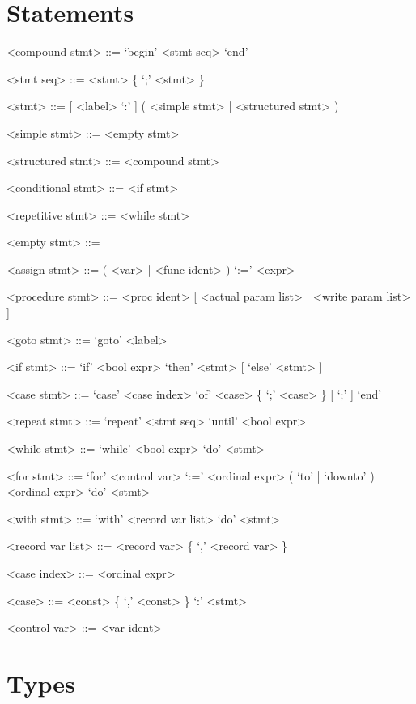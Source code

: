 \documentclass{article}
\begin{document}
\section{Statements}

{
  \begin{grammar}
    <compound stmt> ::= `begin' <stmt seq> `end'

    <stmt seq> ::= <stmt> \{ `;' <stmt> \}

    <stmt> ::= [ <label> `:' ] ( <simple stmt> | <structured stmt> )

    <simple stmt> ::= <empty stmt>   

    <structured stmt> ::= <compound stmt>   

    <conditional stmt> ::= <if stmt> 

    <repetitive stmt> ::= <while stmt>  

    <empty stmt> ::= \hphantom{}

    <assign stmt> ::= ( <var> | <func ident> ) `:=' <expr>

    <procedure stmt> ::= <proc ident> [ <actual param list> | <write param list> ]

    <goto stmt> ::= `goto' <label>

    <if stmt> ::= `if' <bool expr> `then' <stmt> [ `else' <stmt> ]

    <case stmt> ::= `case' <case index> `of' <case> \{ `;' <case> \} [ `;' ] `end'

    <repeat stmt> ::= `repeat' <stmt seq> `until' <bool expr>

    <while stmt> ::= `while' <bool expr> `do' <stmt>

    <for stmt> ::= `for' <control var> `:=' <ordinal expr> ( `to' | `downto' ) \\
    <ordinal expr> `do' <stmt>

    <with stmt> ::= `with' <record var list> `do' <stmt>

    <record var list> ::= <record var> \{ `,' <record var> \}

    <case index> ::= <ordinal expr>

    <case> ::= <const> \{ `,' <const> \} `:' <stmt>

    <control var> ::= <var ident>
  \end{grammar}
}

\section{Types}
\end{document}
